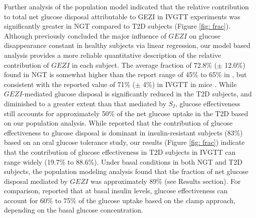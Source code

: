 \documentclass[utf8]{frontiersSCNS} %
\begin{document}
Further analysis of the population model indicated that the relative contribution to total net glucose disposal attributable to GEZI in IVGTT experiments was significantly greater in NGT compared to T2D subjects (Figure \ref{fig: frac}). Although \cite{Kahn_1994} previously concluded the major influence of $GEZI$ on glucose disappearance constant in healthy subjects via linear regression, our model based analysis provides a more reliable quantitative description of the relative contribution of $GEZI$ in each subject. The average fraction of 72.8\% ($\pm$ 12.0\%) found in NGT is somewhat higher than the report range of 45\% to 65\% in \citet{Alford_2018}, but consistent with the reported value of 71\% ($\pm$ 4\%) in IVGTT in mice \citep{PACINI_2001}. While $GEZI$-mediated glucose disposal is significantly reduced in the T2D subjects, and diminished to a greater extent than that mediated by $S_I$, glucose effectiveness still accounts for approximately 50\% of the net glucose uptake in the T2D based on our population analysis. While \citet{Best1996} reported that the contribution of glucose effectiveness to glucose disposal is dominant in insulin-resistant subjects (83\%) based on an oral glucose tolerance study, our results (Figure \ref{fig: frac}) indicate that the contribution of glucose effectiveness in T2D subjects in IVGTT can range widely (19.7\% to 88.6\%). Under basal conditions in both NGT and T2D subjects, the population modeling analysis found that the fraction of net glucose disposal mediated by $GEZI$ was approximately 89\% (see Results section). For comparison, \citet{Best1996} reported that at basal insulin levels, glucose effectiveness can account for 60\% to 75\% of the glucose uptake based on the clamp approach, depending on the basal glucose concentration. 
\end{document}
